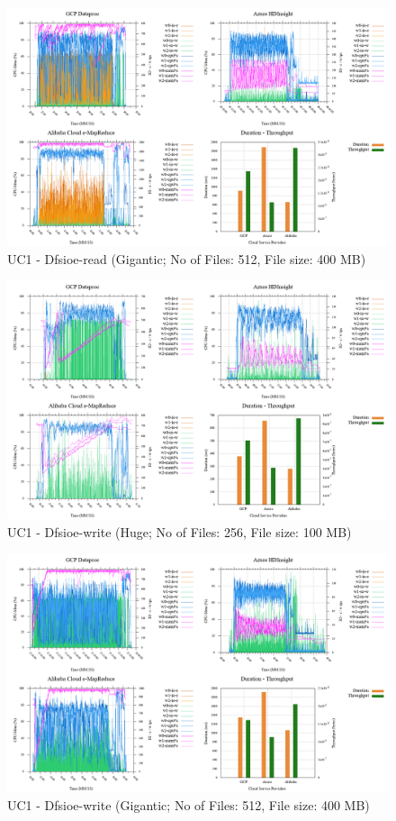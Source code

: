 \documentclass[review]{elsarticle}
\begin{document}
\begin{figure}[b]
	\caption{UC1 - Dfsioe-read (Gigantic; No of Files: 512, File size: 400 MB)}
	\label{fig:uc1-dfsioer-g-cmidt}
	\includegraphics[width=\textwidth]{uc1-dfsioer-g-cmidt}
	\centering
\end{figure}

\begin{figure}[b]
	\caption{UC1 - Dfsioe-write (Huge; No of Files: 256, File size: 100 MB)}
	\label{fig:uc1-dfsioew-h-cmidt}
	\includegraphics[width=\textwidth]{uc1-dfsioew-h-cmidt}
	\centering
\end{figure}

\begin{figure}[b]
	\caption{UC1 - Dfsioe-write (Gigantic; No of Files: 512, File size: 400 MB)}
	\label{fig:uc1-dfsioew-g-cmidt}
	\includegraphics[width=\textwidth]{uc1-dfsioew-g-cmidt}
	\centering
\end{figure}
\end{document}
